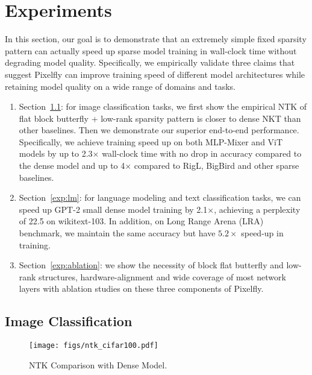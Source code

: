 
\section{Experiments}
\label{sec:experiments}


In this section, our goal is to demonstrate that an extremely simple fixed sparsity pattern can actually speed up sparse model training in wall-clock time without degrading model quality. Specifically, we empirically validate three claims that suggest Pixelfly can improve training speed of different model architectures while retaining model quality on a wide range of domains and tasks.
\begin{enumerate}[leftmargin=*,nosep,nolistsep]
  \item Section~\ref{exp:image}: for image classification tasks, we first show the empirical NTK of flat block butterfly + low-rank sparsity pattern is closer to dense NKT than other baselines. Then we demonstrate our superior end-to-end performance. Specifically, we achieve training speed up on both MLP-Mixer and ViT models by up to 2.3$\times$ wall-clock time with no drop in accuracy compared to the dense model and up to 4$\times$ compared to RigL, BigBird and other sparse baselines.
  \item Section~\ref{exp:lm}: for language modeling and text classification tasks, we can speed up GPT-2 small dense model training by 2.1$\times$, achieving a perplexity of 22.5 on wikitext-103. In addition, on Long Range Arena (LRA) benchmark, we maintain the same accuracy but have $5.2\times$ speed-up in training.
  \item Section~\ref{exp:ablation}: we show the necessity of block flat butterfly and low-rank structures, hardware-alignment and wide coverage of most network layers with ablation studies on these three components of Pixelfly.
 \end{enumerate}

\subsection{Image Classification}
\label{exp:image}

\begin{wrapfigure}{}{0.28\textwidth}
\captionsetup{font=small}
  \iftoggle{arxiv}{}{
  \vspace{-3em}
  }
  \centering
  \texttt{[image: figs/ntk\_cifar100.pdf]}
    \vspace{-1em}
  \caption{NTK Comparison with Dense Model.}
  \label{fig:ntk}
  \vspace{-1em}
\end{wrapfigure}

